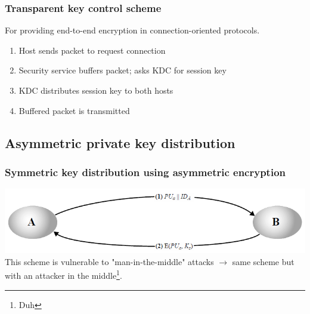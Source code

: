 \documentclass[12pt]{article}
\begin{document}
 \subsubsection{Transparent key control scheme}
 For providing end-to-end encryption in connection-oriented protocols.
 \begin{enumerate}
 	\item Host sends packet to request connection
 	\item Security service buffers packet; asks KDC for session key
 	\item KDC distributes session key to both hosts
 	\item Buffered packet is transmitted
 \end{enumerate}
 
 \subsection{Asymmetric private key distribution}
 \subsubsection{Symmetric key distribution using asymmetric encryption}
 \includegraphics[width=\linewidth]{./slides/L5P3SYM.PNG}\\
 This scheme is vulnerable to "man-in-the-middle" attacks $\rightarrow$ same scheme but with an attacker in the middle\footnote{Duh}.
 
\end{document}
